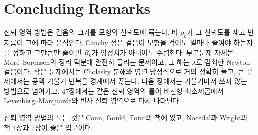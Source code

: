 \section{Concluding Remarks}

신뢰 영역 방법은 걸음의 크기를 모형의 신뢰도에 묶는다. 비 $\rho_k$가 그 신뢰도를 재고 반지름이 그에 따라 움직인다. Cauchy 점은 걸음이 모형을 적어도 얼마나 줄여야 하는지를 정하고 그만큼만 줄이면 $B_k$가 양정치가 아니어도 수렴한다. 부분문제 자체는 Moré--Sorensen의 정리 덕분에 완전히 풀리는 문제이고, 그 해는 $\lambda$로 감쇠한 Newton 걸음이다. 작은 문제에서는 Cholesky 분해와 영년 방정식으로 거의 정확히 풀고, 큰 문제에서는 공액 기울기 반복을 경계에서 끊는다. 다음 장에서는 기울기마저 쓰지 않는 방법으로 넘어가고, 47장에서는 같은 신뢰 영역의 틀이 비선형 최소제곱에서 Levenberg--Marquardt와 반사 신뢰 영역으로 다시 나타난다.

신뢰 영역 방법의 모든 것은 Conn, Gould, Toint의 책\cite{conn2000trust}에 있고, Nocedal과 Wright의 책\cite{nocedal2006} 4장과 7장이 좋은 입문이다.

\chapterreferences
